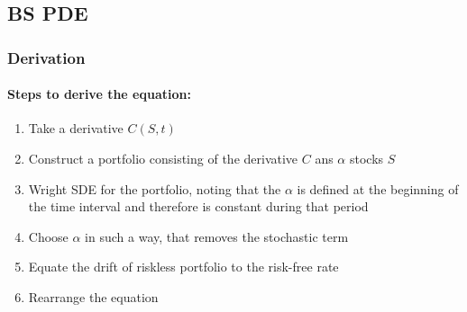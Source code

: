\subsection{BS PDE}
\subsubsection{Derivation}
\paragraph{Steps to derive the equation:}
\begin{enumerate}
	\item Take a derivative $C(S, t)$
	\item Construct a portfolio consisting of the derivative $C$ ans $\alpha$ stocks $S$
	\item Wright SDE for the portfolio, noting that the $\alpha$ is defined at the beginning of the time interval and therefore is constant during that period
	\item Choose $\alpha$ in such a way, that removes the stochastic term
	\item Equate the drift of riskless portfolio to the risk-free rate
	\item Rearrange the equation
\end{enumerate}

